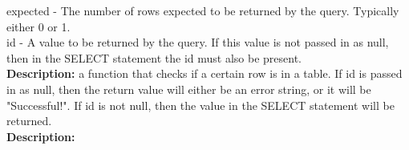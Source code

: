 expected - The number of rows expected to be returned by the query. Typically
either 0 or 1. \\

id - A value to be returned by the query. If this value is not passed
in as null, then in the SELECT statement the id must also be present. \\

\textbf{Description:} a function that checks if a certain row is in a table.
If id is passed in as null, then the return value will either be an error string, or it will be "Successful!". If id is not null, then the value in 
the SELECT statement will be returned. \\
\textbf{Description:}

